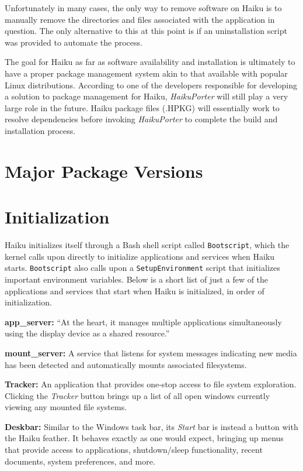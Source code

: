 \documentclass{article}
\begin{document}
Unfortunately in many cases, the only way to remove software on Haiku is to manually remove the directories and files associated with the application in question. The only alternative to this at this point is if an uninstallation script was provided to automate the process.\cite{AppInstallUninstall}

The goal for Haiku as far as software availability and installation is ultimately to have a proper package management system akin to that available with popular Linux distributions.\cite{HaikuFuturePkgMan} According to one of the developers responsible for developing a solution to package management for Haiku, \textit{HaikuPorter} will still play a very large role in the future. Haiku package files (.HPKG) will essentially work to resolve dependencies before invoking \textit{HaikuPorter} to complete the build and installation process.\cite{TappeOnPackages}

\section{Major Package Versions}

\section{Initialization}

Haiku initializes itself through a Bash shell script called \texttt{Bootscript}, which the kernel calls upon directly to initialize applications and services when Haiku starts. \texttt{Bootscript} also calls upon a \texttt{SetupEnvironment} script that initializes important environment variables. Below is a short list of just a few of the applications and services that start when Haiku is initialized, in order of initialization.

\textbf{app\_server:}
``At the heart, it manages multiple applications simultaneously using the display device as a shared resource.''\cite{AppServer}

\textbf{mount\_server:}
A service that listens for system messages indicating new media has been detected and automatically mounts associated filesystems.\cite{AutoMounter}

\textbf{Tracker:}
An application that provides one-stop access to file system exploration. Clicking the \textit{Tracker} button brings up a list of all open windows currently viewing any mounted file systems.\cite{Tracker}

\textbf{Deskbar:}
Similar to the Windows task bar, its \textit{Start} bar is instead a button with the Haiku feather. It behaves exactly as one would expect, bringing up menus that provide access to applications, shutdown/sleep functionality, recent documents, system preferences, and more.\cite{Deskbar}
\end{document}
